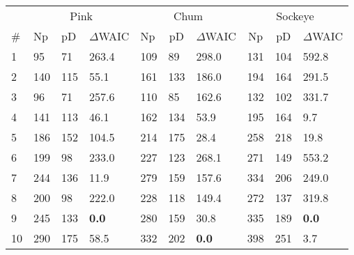 \begin{tabular}{llllllllll}
  \hline
  \multicolumn{1}{r}{} &
            \multicolumn{3}{c}{Pink} &
            \multicolumn{3}{c}{Chum} &
            \multicolumn{3}{c}{Sockeye} \\ 
  \cmidrule(lr){2-4} \cmidrule(lr){5-7} \cmidrule(lr){8-10} 
  \multicolumn{1}{l}{\#} & 
    \multicolumn{1}{l}{Np} & 
    \multicolumn{1}{l}{pD} & 
    \multicolumn{1}{l}{$\Delta$WAIC} & 
    \multicolumn{1}{l}{Np} & 
    \multicolumn{1}{c}{pD} & 
    \multicolumn{1}{c}{$\Delta$WAIC} & 
    \multicolumn{1}{c}{Np} & 
    \multicolumn{1}{c}{pD} & 
    \multicolumn{1}{l}{$\Delta$WAIC} \\ 
  \cmidrule{1-10} 
1 & 95 & 71 & 263.4 & 109 & 89 & 298.0 & 131 & 104 & 592.8 \\ 
  2 & 140 & 115 & 55.1 & 161 & 133 & 186.0 & 194 & 164 & 291.5 \\ 
  3 & 96 & 71 & 257.6 & 110 & 85 & 162.6 & 132 & 102 & 331.7 \\ 
  4 & 141 & 113 & 46.1 & 162 & 134 & 53.9 & 195 & 164 & 9.7 \\ 
  5 & 186 & 152 & 104.5 & 214 & 175 & 28.4 & 258 & 218 & 19.8 \\ 
  6 & 199 & 98 & 233.0 & 227 & 123 & 268.1 & 271 & 149 & 553.2 \\ 
  7 & 244 & 136 & 11.9 & 279 & 159 & 157.6 & 334 & 206 & 249.0 \\ 
  8 & 200 & 98 & 222.0 & 228 & 118 & 149.4 & 272 & 137 & 319.8 \\ 
  9 & 245 & 133 & \textbf{0.0} & 280 & 159 & 30.8 & 335 & 189 & \textbf{0.0} \\ 
  10 & 290 & 175 & 58.5 & 332 & 202 & \textbf{0.0} & 398 & 251 & 3.7 \\ 
   \hline
\end{tabular}
